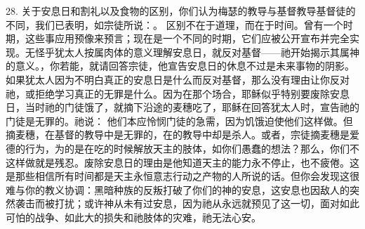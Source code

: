 28. 关于安息日和割礼以及食物的区别，你们认为梅瑟的教导与基督教导基督徒的不同，我们已表明，如宗徒所说：。 区别不在于道理，而在于时间。曾有一个时期，这些事应用预像来预言；现在是一个不同的时期，它们应被公开宣布并完全实现。无怪乎犹太人按属肉体的意义理解安息日，就反对基督——祂开始揭示其属神的意义。，你若能，就请回答宗徒，他宣告安息日的休息不过是未来事物的阴影。 如果犹太人因为不明白真正的安息日是什么而反对基督，那么没有理由让你反对祂，或拒绝学习真正的无罪是什么。因为在那个场合，耶稣似乎特别要废除安息日，当时祂的门徒饿了，就摘下沿途的麦穗吃了，耶稣在回答犹太人时，宣告祂的门徒是无罪的。祂说： 他们本应怜悯门徒的急需，因为饥饿迫使他们这样做。但摘麦穗，在基督的教导中是无罪的，在的教导中却是杀人。或者，宗徒摘麦穗是爱德的行为，为的是在吃的时候解放天主的肢体，如你们愚蠢的想法？那么，你们不这样做就是残忍。废除安息日的理由是他知道天主的能力永不停止，也不疲倦。这是那些相信所有时间都是天主永恒意志行动之产物的人所说的话。但你会发现这很难与你的教义协调：黑暗种族的反叛打破了你们的神的安息，这安息也因敌人的突然袭击而被打扰；或许神从未有过安息，因为祂从永远就预见了这一切，面对如此可怕的战争、如此大的损失和祂肢体的灾难，祂无法心安。\par

